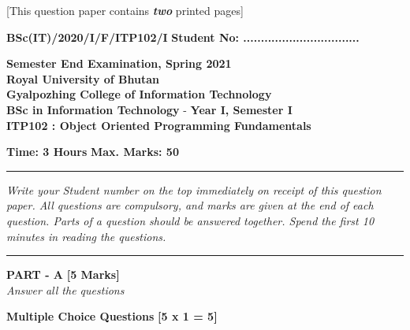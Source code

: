 \documentclass[12pt,a4paper]{exam}
\author{Yonten Jamtsho}
\begin{document}
	\begin{center}
		[This question paper contains \textbf{\textit{two}} printed pages]
	\end{center}
	
	\flushleft \textbf{BSc(IT)/2020/I/F/ITP102/I} 	\hfill \textbf{Student No: .................................}
	
	
	\begin{center}
		\textbf{Semester End Examination, Spring 2021} \\
		\textbf{Royal University of Bhutan} \\
		\textbf{Gyalpozhing College of Information Technology} \\
		\textbf{BSc in Information Technology} - \textbf{Year I, Semester I} \\
		\textbf{ITP102 : Object Oriented Programming Fundamentals} \\
		
	\end{center}

	\flushleft \textbf{Time: 3 Hours} \hfill \textbf{Max. Marks: 50}
	\vspace{0.3cm}
	
	\hrule
	\vspace{0.1cm}
	\textit{Write your Student number on the top immediately on receipt of this question paper. All questions are compulsory, and marks are given at the end of each question. Parts of a question should be answered together. Spend the first 10 minutes in reading the questions.}
	\vspace{0.1cm}
	\hrule
	
	\vspace{0.2cm}
    
    \begin{center}
    	\noindent \textbf{PART - A} \textbf{ [5 Marks]}\\
    	\noindent \textit{Answer all the questions} 
    \end{center}
    
    \vspace{0.5cm}
    
    \noindent \textbf{Multiple Choice Questions} \hfill \textbf{[5 x 1 = 5]}
    
\end{document}
